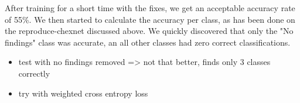 After training for a short time with the fixes, we get an acceptable accuracy rate of 55\%. We then started to calculate the accuracy per class, as has been done on the reproduce-chexnet discussed above. We quickly discovered that only the "No findings" class was accurate, an all other classes had zero correct classifications.

\begin{itemize}
    \item test with no findings removed => not that better, finds only 3 classes correctly
    \item try with weighted cross entropy loss
\end{itemize}
